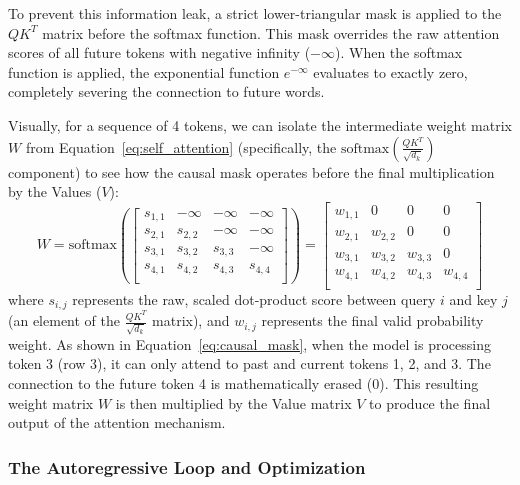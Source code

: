 To prevent this information leak, a strict lower-triangular mask is applied to the $Q K^T$ matrix before the softmax function. This mask overrides the raw attention scores of all future tokens with negative infinity ($-\infty$). When the softmax function is applied, the exponential function $e^{-\infty}$ evaluates to exactly zero, completely severing the connection to future words. 

Visually, for a sequence of 4 tokens, we can isolate the intermediate weight matrix $W$ from Equation~\ref{eq:self_attention} (specifically, the $\text{softmax}\left(\frac{Q K^T}{\sqrt{d_k}}\right)$ component) to see how the causal mask operates before the final multiplication by the Values ($V$):
\begin{equation}
\label{eq:causal_mask}
    W = \text{softmax}\left( \begin{bmatrix}
    s_{1,1} & -\infty & -\infty & -\infty \\
    s_{2,1} & s_{2,2} & -\infty & -\infty \\
    s_{3,1} & s_{3,2} & s_{3,3} & -\infty \\
    s_{4,1} & s_{4,2} & s_{4,3} & s_{4,4} \\
    \end{bmatrix} \right) = \begin{bmatrix}
    w_{1,1} & 0 & 0 & 0 \\
    w_{2,1} & w_{2,2} & 0 & 0 \\
    w_{3,1} & w_{3,2} & w_{3,3} & 0 \\
    w_{4,1} & w_{4,2} & w_{4,3} & w_{4,4} \\
    \end{bmatrix}
\end{equation}
where $s_{i,j}$ represents the raw, scaled dot-product score between query $i$ and key $j$ (an element of the $\frac{Q K^T}{\sqrt{d_k}}$ matrix), and $w_{i,j}$ represents the final valid probability weight. As shown in Equation~\ref{eq:causal_mask}, when the model is processing token 3 (row 3), it can only attend to past and current tokens 1, 2, and 3. The connection to the future token 4 is mathematically erased ($0$). This resulting weight matrix $W$ is then multiplied by the Value matrix $V$ to produce the final output of the attention mechanism.

\subsubsection{The Autoregressive Loop and Optimization}

